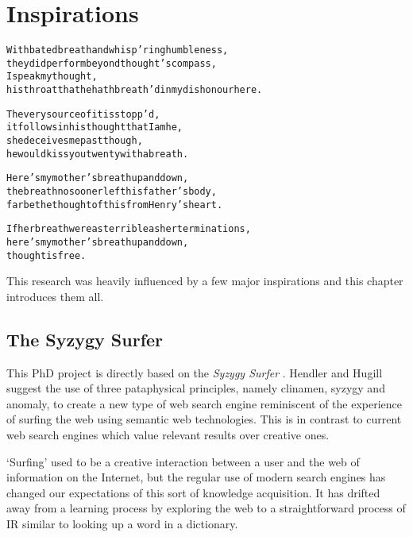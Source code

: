 
\chapter{Inspirations}
\label{ch:inspirations}

\startcontents[chapters]

\vfill

\begin{alltt}\sffamily
With bated breath and whisp'ring humbleness,
they did perform beyond thought's compass,
I speak my thought,
his throat that he hath breath'd in my dishonour here.

The very source of it is stopp'd,
it follows in his thought that I am he,
she deceives me past though,
he would kiss you twenty with a breath.  

Here's my mother's breath up and down,
the breath no sooner left his father's body,
far be the thought of this from Henry's heart.

If her breath were as terrible as her terminations,
here's my mother's breath up and down,
thought is free.
\end{alltt}

\newpage
\minicontents
\spirals

\begin{figure}[!htbp]
\centering
  \def\svgwidth{\textwidth}
  
\end{figure}

This research was heavily influenced by a few major inspirations and this chapter introduces them all.


\section{The Syzygy Surfer}
\label{s:surfer}

This PhD project is directly based on the \textit{Syzygy Surfer} \autocite{Hendler2011, Hendler2013}. Hendler and Hugill suggest the use of three pataphysical principles, namely clinamen, syzygy and anomaly, to create a new type of web search engine reminiscent of the experience of surfing the web using semantic web technologies. This is in contrast to current web search engines which value relevant results over creative ones.

`Surfing' used to be a creative interaction between a user and the web of information on the Internet, but the regular use of modern search engines has changed our expectations of this sort of knowledge acquisition. It has drifted away from a learning process by exploring the web to a straightforward process of \acf{IR} similar to looking up a word in a dictionary.

